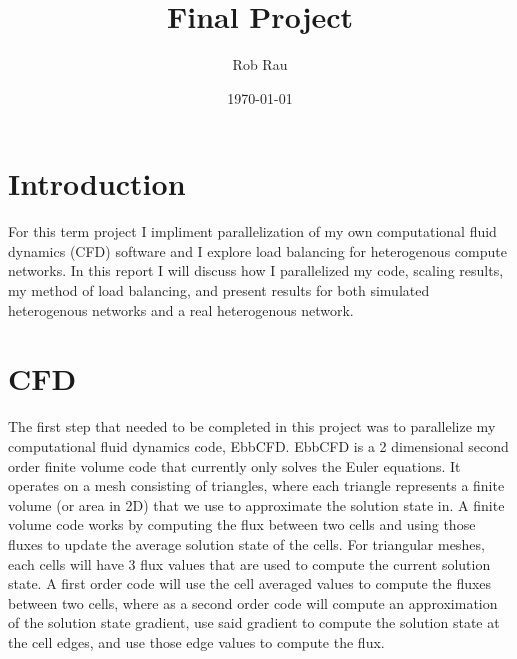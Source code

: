 \documentclass[12pt,parskip=full]{article}
\numberwithin{subsection}{section}
\begin{document}
	\vspace{-4ex}
	\title{Final Project\vspace{-3.5ex}}
	\author{Rob Rau\vspace{-4ex}}
	\date{\today\vspace{-4ex}}
	\maketitle

	\section{Introduction}
		For this term project I impliment parallelization of my own computational fluid dynamics (CFD) software and I explore load balancing
		for heterogenous compute networks. In this report I will discuss how I parallelized my code, scaling results, my method of
		load balancing, and present results for both simulated heterogenous networks and a real heterogenous network. 

	\section{CFD}
		The first step that needed to be completed in this project was to parallelize my computational fluid dynamics code, EbbCFD.
		EbbCFD is a 2 dimensional second order finite volume code that currently only solves the Euler equations. It operates on a
		mesh consisting of triangles, where each triangle represents a finite volume (or area in 2D) that we use to approximate the
		solution state in. A finite volume code works by computing the flux between two cells and using those fluxes to update the
		average solution state of the cells. For triangular meshes, each cells will have 3 flux values that are used to compute the
		current solution state. A first order code will use the cell averaged values to compute the fluxes between two cells, where
		as a second order code will compute an approximation of the solution state gradient, use said gradient to compute the solution
		state at the cell edges, and use those edge values to compute the flux.
		
\end{document}

